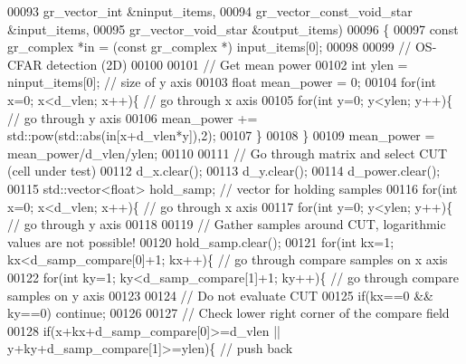 \begin{DoxyCode}
00093                        gr\_vector\_int &ninput\_items,
00094                        gr\_vector\_const\_void\_star &input\_items,
00095                        gr\_vector\_void\_star &output\_items)
00096     \{
00097         \textcolor{keyword}{const} gr\_complex *in = (\textcolor{keyword}{const} gr\_complex *) input\_items[0];
00098 
00099         \textcolor{comment}{// OS-CFAR detection (2D)}
00100         
00101         \textcolor{comment}{// Get mean power}
00102         \textcolor{keywordtype}{int} ylen = ninput\_items[0]; \textcolor{comment}{// size of y axis}
00103         \textcolor{keywordtype}{float} mean\_power = 0;
00104         \textcolor{keywordflow}{for}(\textcolor{keywordtype}{int} x=0; x<d_vlen; x++)\{ \textcolor{comment}{// go through x axis}
00105             \textcolor{keywordflow}{for}(\textcolor{keywordtype}{int} y=0; y<ylen; y++)\{ \textcolor{comment}{// go through y axis}
00106                 mean\_power += std::pow(std::abs(in[x+d\_vlen*y]),2);
00107             \}
00108         \}
00109         mean\_power = mean\_power/d\_vlen/ylen;
00110         
00111         \textcolor{comment}{// Go through matrix and select CUT (cell under test)}
00112         d_x.clear();
00113         d_y.clear();
00114         d_power.clear();
00115         std::vector<float> hold\_samp; \textcolor{comment}{// vector for holding samples}
00116         \textcolor{keywordflow}{for}(\textcolor{keywordtype}{int} x=0; x<d_vlen; x++)\{ \textcolor{comment}{// go through x axis}
00117             \textcolor{keywordflow}{for}(\textcolor{keywordtype}{int} y=0; y<ylen; y++)\{ \textcolor{comment}{// go through y axis}
00118                 
00119                 \textcolor{comment}{// Gather samples around CUT, logarithmic values are not possible!}
00120                 hold\_samp.clear();
00121                 \textcolor{keywordflow}{for}(\textcolor{keywordtype}{int} kx=1; kx<d_samp_compare[0]+1; kx++)\{ \textcolor{comment}{// go through compare samples on x axis}
00122                     \textcolor{keywordflow}{for}(\textcolor{keywordtype}{int} ky=1; ky<d\_samp\_compare[1]+1; ky++)\{ \textcolor{comment}{// go through compare samples on y axis}
00123                         
00124                         \textcolor{comment}{// Do not evaluate CUT}
00125                         \textcolor{keywordflow}{if}(kx==0 && ky==0) \textcolor{keywordflow}{continue};
00126                         
00127                         \textcolor{comment}{// Check lower right corner of the compare field}
00128                         \textcolor{keywordflow}{if}(x+kx+d\_samp\_compare[0]>=d\_vlen || y+ky+d\_samp\_compare[1]>=ylen)\{ \textcolor{comment}{// push back
}
\end{DoxyCode}
